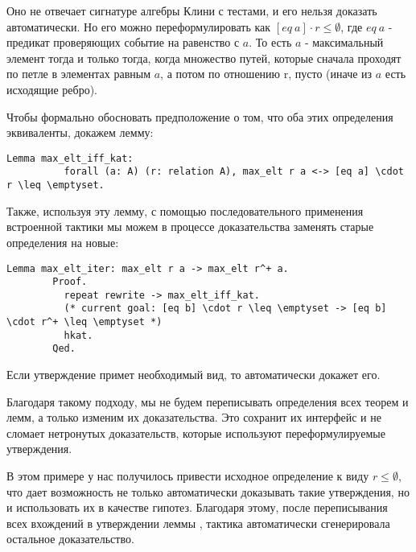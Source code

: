 \documentclass[times
              ,specification
              ,annotation
              ]{itmo-student-thesis}
\begin{document}
      Оно не отвечает сигнатуре алгебры Клини с тестами, и его нельзя доказать автоматически.
      Но его можно переформулировать как $ [eq\ a] \cdot r \le \emptyset $, где $eq\ a$ - предикат проверяющих событие на равенство
      с $a$.
      То есть $ a $ - максимальный элемент тогда и только тогда, когда множество путей, которые сначала
      проходят по петле в элементах равным $a$, а потом по отношению r, пусто
      (иначе из $a$ есть исходящие ребро).

      Чтобы формально обосновать предположение о том, что оба этих определения эквиваленты, докажем лемму:
      \begin{lstlisting}[gobble=8]
        Lemma max_elt_iff_kat:
          forall (a: A) (r: relation A), max_elt r a <-> [eq a] \cdot r \leq \emptyset.
      \end{lstlisting}

      Также, используя эту лемму, с помощью последовательного применения встроенной тактики
       мы можем в процессе доказательства заменять старые определения на новые: 

      \begin{lstlisting}[gobble=8]
        Lemma max_elt_iter: max_elt r a -> max_elt r^+ a.
        Proof.
          repeat rewrite -> max_elt_iff_kat.
          (* current goal: [eq b] \cdot r \leq \emptyset -> [eq b] \cdot r^+ \leq \emptyset *)
          hkat.
        Qed.
      \end{lstlisting}

      Если утверждение примет необходимый вид, то  автоматически докажет его.
      
      Благодаря такому подходу, мы не будем переписывать определения всех теорем и лемм, а только изменим их доказательства.
      Это сохранит их интерфейс и не сломает нетронутых доказательств, которые используют переформулируемые утверждения.

      В этом примере у нас получилось привести исходное определение  к виду $r \leq \emptyset$, что
      дает возможность не только автоматически доказывать такие утверждения, но и использовать
      их в качестве гипотез.
      Благодаря этому, после переписывания всех вхождений  в утверждении леммы
      , тактика  автоматически сгенерировала остальное доказательство.
\end{document}
